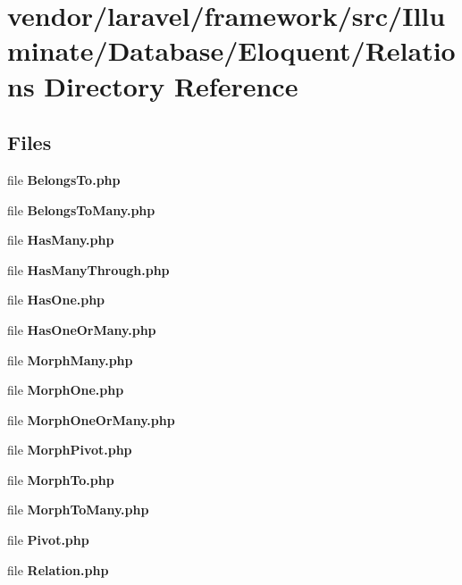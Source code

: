 \section{vendor/laravel/framework/src/\+Illuminate/\+Database/\+Eloquent/\+Relations Directory Reference}
\label{dir_09c09a31f3ad62493311881c087a63d3}
\subsection*{Files}
\begin{DoxyCompactItemize}
\item 
file {\bf Belongs\+To.\+php}
\item 
file {\bf Belongs\+To\+Many.\+php}
\item 
file {\bf Has\+Many.\+php}
\item 
file {\bf Has\+Many\+Through.\+php}
\item 
file {\bf Has\+One.\+php}
\item 
file {\bf Has\+One\+Or\+Many.\+php}
\item 
file {\bf Morph\+Many.\+php}
\item 
file {\bf Morph\+One.\+php}
\item 
file {\bf Morph\+One\+Or\+Many.\+php}
\item 
file {\bf Morph\+Pivot.\+php}
\item 
file {\bf Morph\+To.\+php}
\item 
file {\bf Morph\+To\+Many.\+php}
\item 
file {\bf Pivot.\+php}
\item 
file {\bf Relation.\+php}
\end{DoxyCompactItemize}
